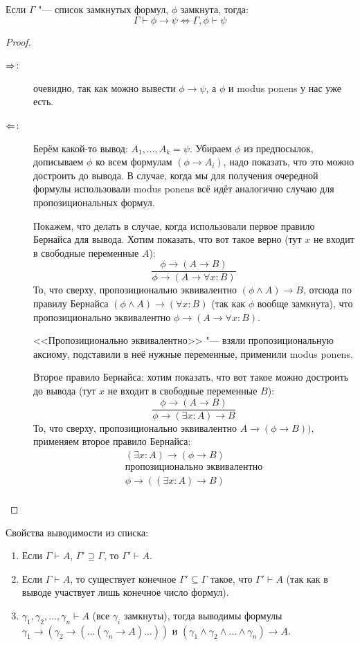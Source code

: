 \begin{lemma}[о дедукции]
	Если $\Gamma$ "--- список замкнутых формул, $\phi$ замкнута, тогда:
	\[ \Gamma \vdash \phi \to \psi \iff \Gamma, \phi \vdash \psi \]
\end{lemma}
\begin{proof}
	\begin{description}
	\item[$\Rightarrow$:]
		очевидно, так как можно вывести $\phi \to \psi$, а $\phi$ и modus ponens у нас уже  есть.
	\item[$\Leftarrow$:]
		Берём какой-то вывод: $A_1, \dots, A_k = \psi$.
		Убираем $\phi$ из предпосылок, дописываем $\phi$ ко всем формулам $(\phi \to A_i)$, надо показать, что
		это можно достроить до вывода.
		В случае, когда мы для получения очередной формулы использовали modus ponens всё идёт аналогично
		случаю для пропозициональных формул.
		
		Покажем, что делать в случае, когда использовали первое правило Бернайса для вывода.
		Хотим показать, что вот такое верно (тут $x$ не входит в свободные переменные $A$):
		\[ \frac{\phi \to (A \to B)}{\phi \to (A \to \forall x \colon B)} \]
		То, что сверху, пропозиционально эквивалентно $(\phi \land A) \to B$, отсюда
		по правилу Бернайса $(\phi \land A) \to (\forall x \colon B)$ (так как $\phi$ вообще замкнута),
		что пропозиционально эквивалентно $\phi \to (A \to \forall x \colon B)$.
		\begin{Rem}
			<<Пропозиционально эквивалентно>> "--- взяли пропозициональную аксиому,
			подставили в неё нужные переменные, применили modus ponens.
		\end{Rem}

		Второе правило Бернайса: хотим показать, что вот такое можно достроить до вывода (тут $x$ не входит в свободные переменные $B$):
		\[ \frac{\phi \to (A \to B)}{\phi \to (\exists x \colon A) \to B} \]
		То, что сверху, пропозиционально эквивалентно $A \to (\phi \to B))$,
		применяем второе правило Бернайса:
		\begin{gather*}
			(\exists x \colon A) \to (\phi \to B) \\
			\text{пропозиционально эквивалентно} \\
			\phi \to ((\exists x \colon A) \to B) \\
		\end{gather*}
	\end{description}
\end{proof}

Свойства выводимости из списка:
\begin{enumerate}
	\item Если $\Gamma \vdash A$, $\Gamma' \supseteq \Gamma$, то $\Gamma' \vdash A$.
	\item Если $\Gamma \vdash A$, то существует конечное $\Gamma' \subseteq \Gamma$ такое, что $\Gamma' \vdash A$ (так как в выводе участвует лишь конечное число формул).
	\item $\gamma_1, \gamma_2, \dots, \gamma_n \vdash A$ (все $\gamma_i$ замкнуты), тогда выводимы формулы
		$\gamma_1 \to (\gamma_2 \to (\dots (\gamma_n \to A)\dots))$
		и
		$(\gamma_1 \land \gamma_2 \land \dots \land \gamma_n) \to A$.
\end{enumerate}

